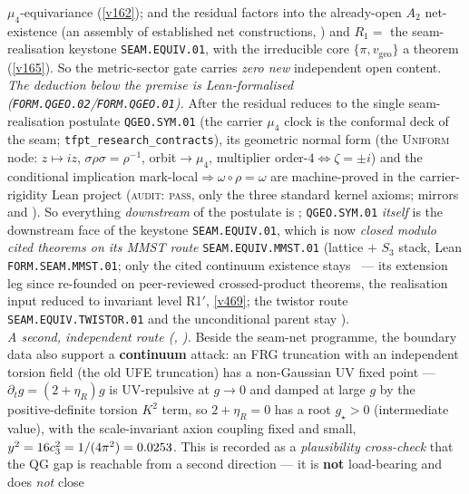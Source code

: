 $\mu_4$-equivariance (\vref{v162}); and the residual factors into the already-open $A_2$ net-existence (an
assembly of established net constructions, \mC) and $R_1=$ the seam-realisation keystone \texttt{SEAM.EQUIV.01}, with the irreducible core
$\{\pi,v_{\mathrm{geo}}\}$ a theorem (\vref{v165}). So the metric-sector gate carries \emph{zero new}
independent open content. 
\smallskip\\
\noindent\emph{The deduction below the premise is Lean-formalised (\texttt{FORM.QGEO.02}/\texttt{FORM.QGEO.01}).}
After the residual reduces to the single seam-realisation postulate \texttt{QGEO.SYM.01} (the carrier
$\mu_4$ clock is the conformal deck of the seam; \texttt{tfpt\_research\_contracts}), its geometric normal
form (the \textsc{Uniform} node: $z\mapsto iz$, $\sigma\rho\sigma=\rho^{-1}$, orbit$\to\mu_4$, multiplier
order-$4\Leftrightarrow\zeta{=}\pm i$) and the conditional implication mark-local$\Rightarrow\omega\circ
\rho=\omega$ are machine-proved in the carrier-rigidity Lean project (\textsc{audit: pass}, only the three
standard kernel axioms; mirrors  and ).
So everything \emph{downstream} of the postulate is \mE; \texttt{QGEO.SYM.01} \emph{itself} is the downstream
face of the keystone \texttt{SEAM.EQUIV.01}, which is now \emph{closed modulo cited theorems on its MMST route}
\texttt{SEAM.EQUIV.MMST.01} (lattice $+$ $S_3$
stack, Lean \texttt{FORM.SEAM.MMST.01}; only the cited continuum existence stays \mO\ --- its extension leg since
re-founded on peer-reviewed crossed-product theorems, the realisation input reduced to invariant level R1$'$,
\vref{v469}; the twistor route \texttt{SEAM.EQUIV.TWISTOR.01} and the unconditional parent stay \mO).
\smallskip\\
\noindent\emph{A second, independent route (, \mO).} Beside the seam-net
programme, the boundary data also support a \textbf{continuum} attack: an FRG truncation with an independent
torsion field (the old UFE truncation) has a non-Gaussian UV fixed point --- $\partial_t g=(2+\eta_R)g$ is
UV-repulsive at $g\!\to\!0$ and damped at large $g$ by the positive-definite torsion $K^2$ term, so
$2+\eta_R=0$ has a root $g_\star>0$ (intermediate value), with the scale-invariant axion coupling fixed and
small, $y^2=16c_3^2=1/(4\pi^2)=0.0253$. This is recorded as a \emph{plausibility cross-check} that the
QG gap is reachable from a second direction --- it is \textbf{not} load-bearing and does \emph{not} close
